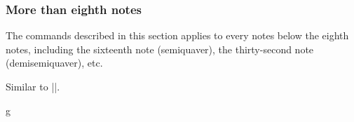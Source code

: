 \subsubsection{More than eighth notes}\label{sec:music-notes:commands:more-than-eighth}
The commands described in this section applies to every notes below the eighth 
notes, including the sixteenth note (semiquaver), the thirty-second note 
(demisemiquaver), etc.
\begin{command}{\tmmorethaneighth{}}
  Similar to |\tmhalf|.
\end{command}
\begin{codeexample}[]
\begin{tmline}%
\begin{tmstaff}{g}{}
\end{tmstaff}%
\end{tmline}
\end{codeexample}
